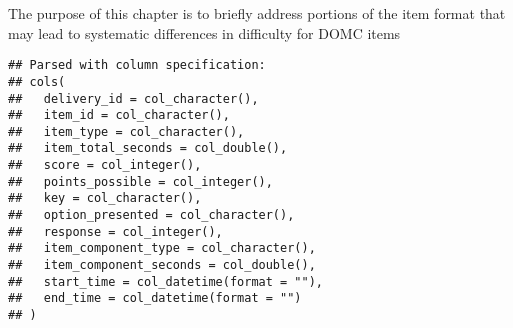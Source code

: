 \documentclass[]{book}
\newenvironment{Shaded}{\begin{snugshade}}{\end{snugshade}}
\newcommand{\KeywordTok}[1]{\textcolor[rgb]{0.13,0.29,0.53}{\textbf{#1}}}
\newcommand{\DecValTok}[1]{\textcolor[rgb]{0.00,0.00,0.81}{#1}}
\newcommand{\StringTok}[1]{\textcolor[rgb]{0.31,0.60,0.02}{#1}}
\newcommand{\ControlFlowTok}[1]{\textcolor[rgb]{0.13,0.29,0.53}{\textbf{#1}}}
\newcommand{\OperatorTok}[1]{\textcolor[rgb]{0.81,0.36,0.00}{\textbf{#1}}}
\newcommand{\NormalTok}[1]{#1}
\theoremstyle{definition}
\theoremstyle{definition}
\theoremstyle{definition}
\theoremstyle{remark}
\begin{document}
The purpose of this chapter is to briefly address portions of the item
format that may lead to systematic differences in difficulty for DOMC
items

\begin{Shaded}
\end{Shaded}

\begin{verbatim}
## Parsed with column specification:
## cols(
##   delivery_id = col_character(),
##   item_id = col_character(),
##   item_type = col_character(),
##   item_total_seconds = col_double(),
##   score = col_integer(),
##   points_possible = col_integer(),
##   key = col_character(),
##   option_presented = col_character(),
##   response = col_integer(),
##   item_component_type = col_character(),
##   item_component_seconds = col_double(),
##   start_time = col_datetime(format = ""),
##   end_time = col_datetime(format = "")
## )
\end{verbatim}
\end{document}
